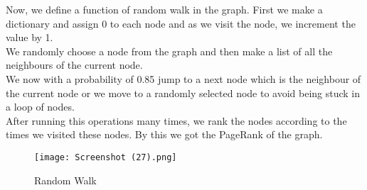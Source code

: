 \documentclass{article}
\begin{document}
Now, we define a function of random walk in the graph. First we make a dictionary and assign 0 to each node and as we visit the node, we increment the value by 1.  \\
We randomly choose a node from the graph and then make a list of all the neighbours of the current node. \\
We now with a probability of 0.85 jump to a next node which is the neighbour of the current node or we move to a randomly selected node to avoid being stuck in a loop of nodes.\\
After running this operations many times, we rank the nodes according to the times we visited these nodes. By this we got the PageRank of the graph.
\begin{figure}
    \centering
    \texttt{[image: Screenshot (27).png]}
    \caption{Random Walk}
    \label{fig:enter-label}
\end{figure}
\end{document}
